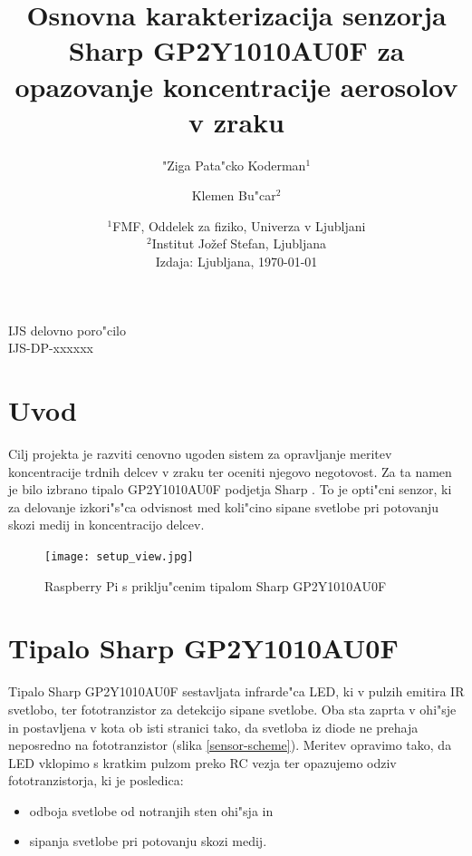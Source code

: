 \documentclass[11pt,a4paper]{article}
\begin{document}
\title{Osnovna karakterizacija senzorja Sharp GP2Y1010AU0F za opazovanje koncentracije aerosolov v zraku}
\author{"Ziga Pata"cko Koderman$^1$ \and Klemen Bu"car$^2$}
\date{%
  $^1$FMF, Oddelek za fiziko, Univerza v Ljubljani\\
  $^2$Institut Jožef Stefan, Ljubljana\\[3ex]
  Izdaja: Ljubljana, \today
}

\maketitle
\thispagestyle{empty}

\begin{center}
IJS delovno poro"cilo\\ IJS-DP-xxxxxx
\end{center}

\tableofcontents
\pagebreak

\section{Uvod}

Cilj projekta je razviti cenovno ugoden sistem za opravljanje meritev koncentracije trdnih delcev v zraku ter oceniti njegovo negotovost. Za ta namen je bilo izbrano tipalo GP2Y1010AU0F podjetja Sharp \cite{sharp-gp2y1010au0f}. To je opti"cni senzor, ki za delovanje izkori"s"ca odvisnost med koli"cino sipane svetlobe pri potovanju skozi medij in koncentracijo delcev.

\vspace{3cm}
\begin{figure}[H]
	\begin{center}
		\texttt{[image: setup\_view.jpg]}
		\caption{Raspberry Pi s priklju"cenim tipalom Sharp GP2Y1010AU0F}
		\label{setup-view}
	\end{center}
\end{figure}

\pagebreak

\section{Tipalo Sharp GP2Y1010AU0F}

Tipalo Sharp GP2Y1010AU0F \cite{sharp-gp2y1010au0f} sestavljata infrarde"ca LED, ki v pulzih emitira IR svetlobo, ter fototranzistor za detekcijo sipane svetlobe. Oba sta zaprta v ohi"sje in postavljena v kota ob isti stranici tako, da svetloba iz diode ne prehaja neposredno na fototranzistor (slika \ref{sensor-scheme}). Meritev opravimo tako, da LED vklopimo s kratkim pulzom preko RC vezja ter opazujemo odziv fototranzistorja, ki je posledica:
\begin{itemize}
	\item odboja svetlobe od notranjih sten ohi"sja in
	\item sipanja svetlobe pri potovanju skozi medij.
\end{itemize}
\end{document}
